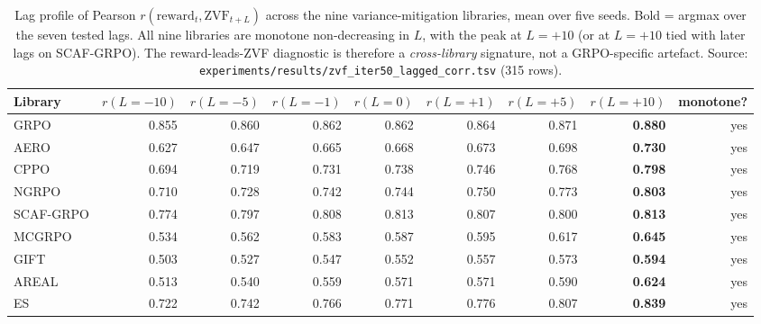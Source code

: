 \begin{table}[htbp]
\centering
\small
\setlength{\tabcolsep}{4pt}
\begin{tabular}{lrrrrrrrr}
\hline
Library      & $r(L{=}{-}10)$ & $r(L{=}{-}5)$ & $r(L{=}{-}1)$ & $r(L{=}0)$ & $r(L{=}{+}1)$ & $r(L{=}{+}5)$ & $r(L{=}{+}10)$ & monotone? \\
\hline
GRPO         & 0.855 & 0.860 & 0.862 & 0.862 & 0.864 & 0.871 & \textbf{0.880} & yes \\
AERO         & 0.627 & 0.647 & 0.665 & 0.668 & 0.673 & 0.698 & \textbf{0.730} & yes \\
CPPO         & 0.694 & 0.719 & 0.731 & 0.738 & 0.746 & 0.768 & \textbf{0.798} & yes \\
NGRPO        & 0.710 & 0.728 & 0.742 & 0.744 & 0.750 & 0.773 & \textbf{0.803} & yes \\
SCAF-GRPO    & 0.774 & 0.797 & 0.808 & 0.813 & 0.807 & 0.800 & \textbf{0.813} & yes \\
MCGRPO       & 0.534 & 0.562 & 0.583 & 0.587 & 0.595 & 0.617 & \textbf{0.645} & yes \\
GIFT         & 0.503 & 0.527 & 0.547 & 0.552 & 0.557 & 0.573 & \textbf{0.594} & yes \\
AREAL        & 0.513 & 0.540 & 0.559 & 0.571 & 0.571 & 0.590 & \textbf{0.624} & yes \\
ES           & 0.722 & 0.742 & 0.766 & 0.771 & 0.776 & 0.807 & \textbf{0.839} & yes \\
\hline
\end{tabular}
\caption{Lag profile of Pearson $r(\mathrm{reward}_t,\mathrm{ZVF}_{t+L})$
across the nine variance-mitigation libraries, mean over five seeds.
Bold = argmax over the seven tested lags. All nine libraries are
monotone non-decreasing in $L$, with the peak at $L{=}{+}10$ (or at
$L{=}{+}10$ tied with later lags on SCAF-GRPO). The reward-leads-ZVF
diagnostic is therefore a \emph{cross-library} signature, not a
GRPO-specific artefact. Source:
\texttt{experiments/results/zvf_iter50_lagged_corr.tsv} (315 rows).}
\label{tab:zvf-lag-summary}
\end{table}

